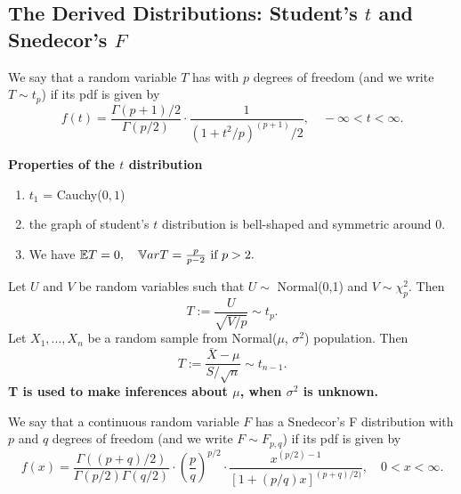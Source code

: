 \subsection{The Derived Distributions: Student’s $t$ and Snedecor’s $F$}
\begin{definition}
We say that a random variable $T$ has  with $p$ degrees of freedom (and we write $T \sim t_p$) if its pdf is given by
$$
f(t) = \frac{\Gamma(p+1)/2}{\Gamma(p/2)} \cdot
\frac{1}{(1+t^2/p)^(p+1)/2}, \quad -\infty < t < \infty.
$$
\end{definition}
\textbf{Properties of the $t$ distribution}
\begin{enumerate}
    \item $t_1$ = Cauchy($0,1$)
    \item the graph of student's $t$ distribution is bell-shaped and symmetric around 0.
    \item We have
    $
    \mathbb E T = 0, \quad \mathbb V ar T = \frac{p}{p-2} \text{ if } p >2.
    $
\end{enumerate}
Let $U$ and $V$ be random variables such that $U \sim $ Normal(0,1) and $V \sim \chi_p^2$. Then
$$
T := \frac{U}{\sqrt{V/p}} \sim t_p.
$$
 Let $X_1,...,X_n$ be a random sample from Normal($\mu$, $\sigma^2$) population. Then
$$
T := \frac{\bar{X} - \mu}{S / \sqrt{n}} \sim t_{n-1}.
$$
\textbf{T is used to make inferences about $\mu$, when $\sigma^2$ is unknown.}
\begin{definition}
We say that a continuous random variable $F$ has a Snedecor’s F distribution with $p$ and $q$ degrees of freedom (and we write $F \sim F_{p,q}$) if its pdf is given by
$$
f(x) = \frac{\Gamma((p+q)/2)}{\Gamma(p/2)\Gamma(q/2)} \cdot \left( 
\frac{p}{q}
\right)^{p/2} \cdot
\frac{x^{(p/2)-1}}{[1+(p/q)x]^{(p+q)/2)}}, \quad 0 < x < \infty.
$$
\end{definition}
